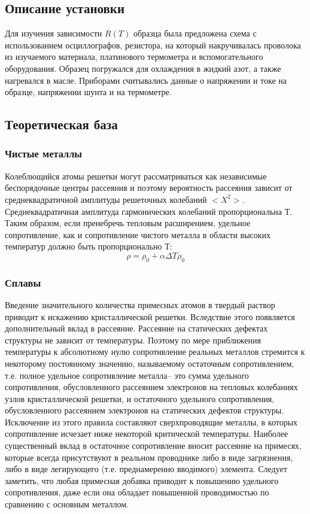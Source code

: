 \documentclass[a4paper, 12pt]{article}
\begin{document}
\subsection{Описание установки}

Для изучения зависимости $R(T)$ образца была предложена схема с использованием осциллографов, резистора, на который накручивалась проволока из изучаемого материала, платинового термометра и вспомогательного оборудования. Образец погружался для охлаждения в жидкий азот, а также нагревался в масле. Приборами считывались данные о напряжении и токе на образце, напряжении шунта и на термометре.
\subsection{Теоретическая база}
\subsubsection{Чистые металлы}
Колеблющийся атомы решетки могут рассматриваться как независимые беспорядочные центры рассеяния и поэтому вероятность рассеяния зависит от среднеквадратичной амплитуды решеточных колебаний $<\!X^2\!>$. Среднеквадратичная амплитуда гармонических колебаний пропорциональна $Т$. Таким образом, если пренебречь тепловым расширением, удельное сопротивление, как и сопротивление чистого металла в области высоких температур должно быть пропорционально $Т$:$$ \rho=\rho_0 +\alpha\Delta T \rho_0$$
\subsubsection{Сплавы}
Введение значительного количества примесных атомов в твердый раствор приводит к искажению кристаллической решетки. Вследствие этого появляется дополнительный вклад в рассеяние. Рассеяние на статических дефектах структуры не зависит от температуры. Поэтому по мере приближения температуры к абсолютному нулю сопротивление реальных металлов стремится к некоторому постоянному значению, называемому остаточным сопротивлением, т.е. полное удельное сопротивление металла– это сумма удельного сопротивления, обусловленного рассеянием электронов на тепловых колебаниях узлов кристаллической решетки, и остаточного удельного сопротивления, обусловленного рассеянием электронов на статических дефектов структуры.
\newline
Исключение из этого правила составляют сверхпроводящие металлы, в которых сопротивление исчезает ниже некоторой критической температуры.
\newline
Наиболее существенный вклад в остаточное сопротивление вносит рассеяние на примесях, которые всегда присутствуют в реальном проводнике либо в виде загрязнения, либо в виде легирующего (т.е. преднамеренно вводимого) элемента. Следует заметить, что любая примесная добавка приводит к повышению удельного сопротивления, даже если она обладает повышенной проводимостью по сравнению с основным металлом.
\end{document}
